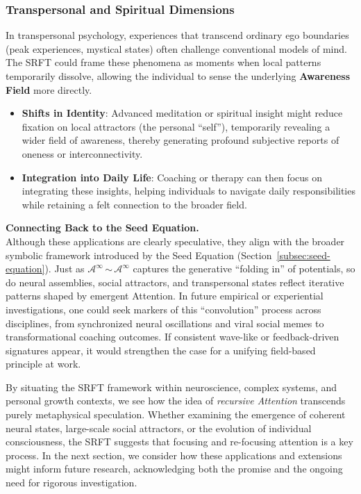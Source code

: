 \documentclass[12pt,a4paper]{article}
\begin{document}
\subsubsection{Transpersonal and Spiritual Dimensions}
In transpersonal psychology, experiences that transcend ordinary ego boundaries (peak experiences, mystical states) often challenge conventional models of mind. The SRFT could frame these phenomena as moments when local patterns temporarily dissolve, allowing the individual to sense the underlying \textbf{Awareness Field} more directly. 
\begin{itemize}
    \item \textbf{Shifts in Identity}: Advanced meditation or spiritual insight might reduce fixation on local attractors (the personal “self”), temporarily revealing a wider field of awareness, thereby generating profound subjective reports of oneness or interconnectivity.
    \item \textbf{Integration into Daily Life}: Coaching or therapy can then focus on integrating these insights, helping individuals to navigate daily responsibilities while retaining a felt connection to the broader field.
\end{itemize}

\medskip

\noindent
\textbf{Connecting Back to the Seed Equation.}\\
Although these applications are clearly speculative, they align with the broader symbolic framework introduced by the Seed Equation (Section~\ref{subsec:seed-equation}). Just as \(\mathscr{A}^\infty\)\,$\sim$\,\(\mathscr{A}^\infty\) captures the generative “folding in” of potentials, so do neural assemblies, social attractors, and transpersonal states reflect iterative patterns shaped by emergent Attention. In future empirical or experiential investigations, one could seek markers of this “convolution” process across disciplines, from synchronized neural oscillations and viral social memes to transformational coaching outcomes. If consistent wave-like or feedback-driven signatures appear, it would strengthen the case for a unifying field-based principle at work.

\medskip

By situating the SRFT framework within neuroscience, complex systems, and personal growth contexts, we see how the idea of \emph{recursive Attention} transcends purely metaphysical speculation. Whether examining the emergence of coherent neural states, large-scale social attractors, or the evolution of individual consciousness, the SRFT suggests that focusing and re-focusing attention is a key process. In the next section, we consider how these applications and extensions might inform future research, acknowledging both the promise and the ongoing need for rigorous investigation.
\end{document}

